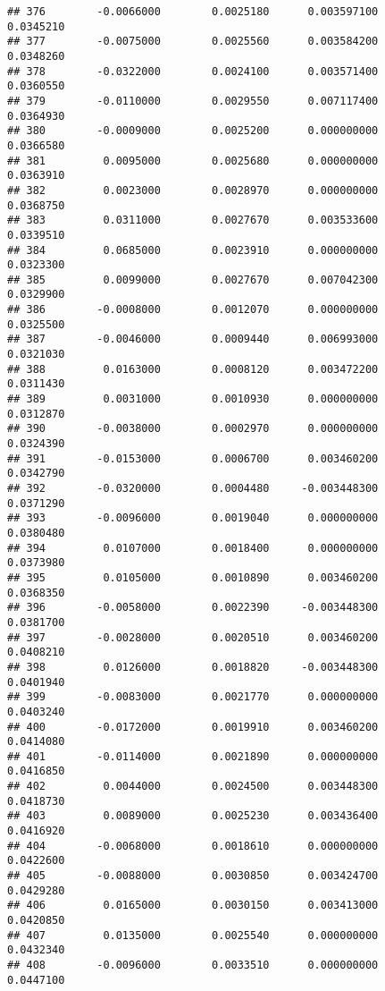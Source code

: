 \documentclass[
]{article}
\begin{document}
\begin{verbatim}
## 376        -0.0066000        0.0025180      0.003597100             0.0345210
## 377        -0.0075000        0.0025560      0.003584200             0.0348260
## 378        -0.0322000        0.0024100      0.003571400             0.0360550
## 379        -0.0110000        0.0029550      0.007117400             0.0364930
## 380        -0.0009000        0.0025200      0.000000000             0.0366580
## 381         0.0095000        0.0025680      0.000000000             0.0363910
## 382         0.0023000        0.0028970      0.000000000             0.0368750
## 383         0.0311000        0.0027670      0.003533600             0.0339510
## 384         0.0685000        0.0023910      0.000000000             0.0323300
## 385         0.0099000        0.0027670      0.007042300             0.0329900
## 386        -0.0008000        0.0012070      0.000000000             0.0325500
## 387        -0.0046000        0.0009440      0.006993000             0.0321030
## 388         0.0163000        0.0008120      0.003472200             0.0311430
## 389         0.0031000        0.0010930      0.000000000             0.0312870
## 390        -0.0038000        0.0002970      0.000000000             0.0324390
## 391        -0.0153000        0.0006700      0.003460200             0.0342790
## 392        -0.0320000        0.0004480     -0.003448300             0.0371290
## 393        -0.0096000        0.0019040      0.000000000             0.0380480
## 394         0.0107000        0.0018400      0.000000000             0.0373980
## 395         0.0105000        0.0010890      0.003460200             0.0368350
## 396        -0.0058000        0.0022390     -0.003448300             0.0381700
## 397        -0.0028000        0.0020510      0.003460200             0.0408210
## 398         0.0126000        0.0018820     -0.003448300             0.0401940
## 399        -0.0083000        0.0021770      0.000000000             0.0403240
## 400        -0.0172000        0.0019910      0.003460200             0.0414080
## 401        -0.0114000        0.0021890      0.000000000             0.0416850
## 402         0.0044000        0.0024500      0.003448300             0.0418730
## 403         0.0089000        0.0025230      0.003436400             0.0416920
## 404        -0.0068000        0.0018610      0.000000000             0.0422600
## 405        -0.0088000        0.0030850      0.003424700             0.0429280
## 406         0.0165000        0.0030150      0.003413000             0.0420850
## 407         0.0135000        0.0025540      0.000000000             0.0432340
## 408        -0.0096000        0.0033510      0.000000000             0.0447100

\end{verbatim}
\end{document}
